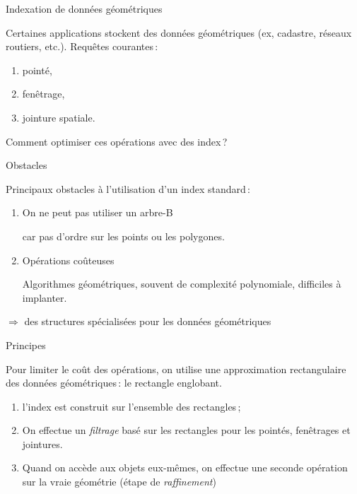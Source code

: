 \begin{frame}{Indexation de données géométriques}

Certaines applications stockent des données géométriques
(ex, cadastre, réseaux routiers, etc.). Requêtes
courantes\,:
\begin{enumerate}
  \item pointé,
   \item fenêtrage,
  \item jointure spatiale. 
\end{enumerate}
Comment optimiser ces opérations avec des index\,?

\end{frame}
\begin{frame}{Obstacles}

Principaux obstacles à l'utilisation d'un index standard\,:
\begin{enumerate}
  \item On ne peut pas utiliser un arbre-B

      car 
      pas d'ordre sur les points ou les polygones.

  \item Opérations coûteuses

      Algorithmes géométriques, souvent de complexité
            polynomiale, difficiles à implanter.
\end{enumerate}

$\Rightarrow$ des structures spécialisées pour les
données géométriques

\end{frame}
\begin{frame}{Principes}

Pour limiter le coût des opérations, on 
utilise une approximation rectangulaire 
des données géométriques\,: le rectangle englobant.

\begin{enumerate}
  \item l'index est construit sur l'ensemble des rectangles\,;
  \item On effectue un {\em filtrage} basé sur les rectangles
         pour les pointés, fenêtrages et jointures.
  \item Quand on accède aux objets eux-mêmes, on effectue
          une seconde opération sur la vraie géométrie
          (étape de {\em raffinement})
\end{enumerate}


\end{frame}
